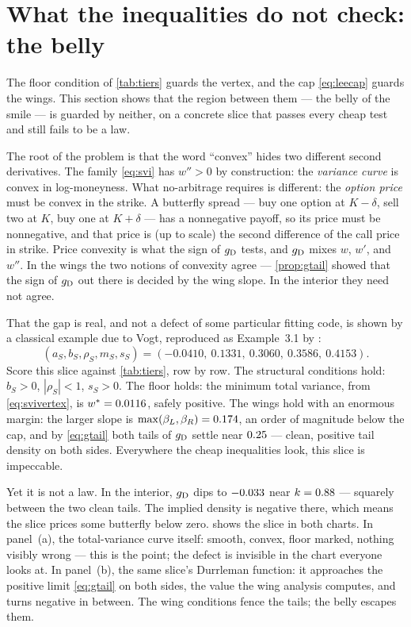 \section{What the inequalities do not check: the belly}
\label{sec:svibelly}

The floor condition of \cref{tab:tiers} guards the vertex, and the cap
\eqref{eq:leecap} guards the wings.  This section shows that the region
between them --- the belly of the smile --- is guarded by neither, on a
concrete slice that passes every cheap test and still fails to be a
law.

The root of the problem is that the word ``convex'' hides two different
second derivatives.  The family \eqref{eq:svi} has $w''>0$ by
construction: the \emph{variance curve} is convex in log-moneyness.
What no-arbitrage requires is different: the \emph{option price} must be
convex in the strike.  A butterfly spread --- buy one option at
$K-\delta$, sell two at $K$, buy one at $K+\delta$ --- has a nonnegative
payoff, so its price must be nonnegative, and that price is (up to
scale) the second difference of the call price in strike.  Price
convexity is what the sign of $g_{\rm D}$ tests, and $g_{\rm D}$ mixes
$w$, $w'$, and $w''$.  In the wings the two notions of convexity agree
--- \cref{prop:gtail} showed that the sign of $g_{\rm D}$ out there is
decided by the wing slope.  In the interior they need not agree.

That the gap is real, and not a defect of some particular fitting code,
is shown by a classical example due to Vogt, reproduced as Example~3.1
by \citet{GatheralJacquier2014}:
\[
(a_S,b_S,\rho_S,m_S,s_S)=(-0.0410,\ 0.1331,\ 0.3060,\ 0.3586,\ 0.4153).
\]
Score this slice against \cref{tab:tiers}, row by row.  The structural
conditions hold: $b_S>0$, $|\rho_S|<1$, $s_S>0$.  The floor holds: the
minimum total variance, from \eqref{eq:svivertex}, is
$w^*=0.0116$, safely positive.  The wings hold with an
enormous margin: the larger slope is
$\max(\beta_L,\beta_R)=0.174$, an order of magnitude below the
cap, and by \eqref{eq:gtail} both tails of $g_{\rm D}$ settle near
$0.25$ --- clean, positive tail density on both sides.
Everywhere the cheap inequalities look, this slice is impeccable.

Yet it is not a law.  In the interior, $g_{\rm D}$ dips to
$-0.033$ near $k=0.88$ --- squarely between the two
clean tails.  The implied density is negative there, which means the
slice prices some butterfly below zero.   shows the
slice in both charts.  In panel~(a), the total-variance curve itself:
smooth, convex, floor marked, nothing visibly wrong --- this is the
point; the defect is invisible in the chart everyone looks at.  In
panel~(b), the same slice's Durrleman function: it approaches the
positive limit \eqref{eq:gtail} on both sides, the value the wing
analysis computes, and turns negative in between.  The wing conditions
fence the tails; the belly escapes them.

